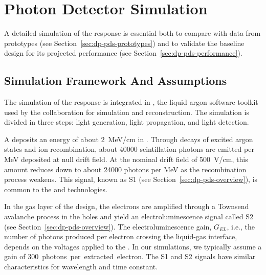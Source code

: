 \section{Photon Detector Simulation}
\label{sec:dp-pds-simulation}

A detailed simulation of the  response is essential both to compare with data from  prototypes (see Section~\ref{sec:dp-pds-prototypes}) and to validate the  baseline design for its projected performance (see Section~\ref{sec:dp-pds-performance}).


\subsection{Simulation Framework And Assumptions}
\label{subsec:dp-pds-simulation_assumptions}

The simulation of the  response is integrated in , the liquid argon software toolkit used by the \dune collaboration for simulation and reconstruction. The simulation is divided in three steps: light generation, light propagation, and light detection.

A  deposits an energy of about \SI{2}{\MeV/\cm} in . Through decays of excited argon states and ion recombination, about \num{40000} scintillation photons are emitted per \si{\MeV} deposited at null drift field. At the nominal drift field of \SI{500}{\V/\cm}, this amount reduces down to about \num{24000} photons per \si{\MeV} as the recombination process weakens. This signal, known as S1 (see Section~\ref{sec:dp-pds-overview}), is common to the  and  technologies.

In the gas layer of the  design, the electrons are amplified through a Townsend avalanche process in the  holes and %
yield an electroluminescence signal called S2 (see Section~\ref{sec:dp-pds-overview}). The electroluminescence gain, $G_{EL}$, i.e., the number of photons produced per electron crossing the liquid-gas interface, depends on the voltages applied to the . In our simulations, we typically assume a gain of \SI{300}{photons per extracted electron}. The S1 and S2 signals have similar characteristics for wavelength and time constant. %

